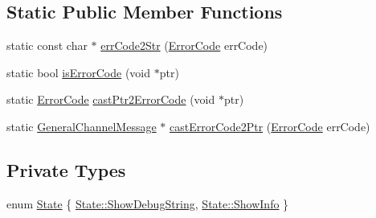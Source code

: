 \subsection*{Static Public Member Functions}
\begin{DoxyCompactItemize}
\item 
static const char $\ast$ \hyperlink{classGeneralChannelMessage_aacef197db8365b40ebc65d33874831a2}{err\-Code2\-Str} (\hyperlink{classGeneralChannelMessage_a4273153a78b91f1bbc1005c7fc83a42b}{Error\-Code} err\-Code)
\item 
static bool \hyperlink{classGeneralChannelMessage_a78584063709d67ee1cd73ce4e3a5e152}{is\-Error\-Code} (void $\ast$ptr)
\item 
static \hyperlink{classGeneralChannelMessage_a4273153a78b91f1bbc1005c7fc83a42b}{Error\-Code} \hyperlink{classGeneralChannelMessage_aa2a46a58ecfda4b9e6277f8d48101d5a}{cast\-Ptr2\-Error\-Code} (void $\ast$ptr)
\item 
static \hyperlink{classGeneralChannelMessage}{General\-Channel\-Message} $\ast$ \hyperlink{classGeneralChannelMessage_ae54666aaf4da7e77fedfaf9c6d0f4966}{cast\-Error\-Code2\-Ptr} (\hyperlink{classGeneralChannelMessage_a4273153a78b91f1bbc1005c7fc83a42b}{Error\-Code} err\-Code)
\end{DoxyCompactItemize}
\subsection*{Private Types}
\begin{DoxyCompactItemize}
\item 
enum \hyperlink{classGeneralChannelMessage_aa051da5753574d8fe644fdbcc2cd2412}{State} \{ \hyperlink{classGeneralChannelMessage_aa051da5753574d8fe644fdbcc2cd2412ad528eed6edec05921bab7a484e1f48f0}{State\-::\-Show\-Debug\-String}, 
\hyperlink{classGeneralChannelMessage_aa051da5753574d8fe644fdbcc2cd2412ae43857c44f7a3268c1a71df7a2150cca}{State\-::\-Show\-Info}
 \}
\end{DoxyCompactItemize}
